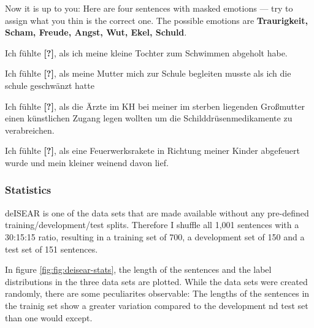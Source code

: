 Now it is up to you: Here are four sentences with masked emotions --- try to assign what you thin is the correct one.
The possible emotions are \textbf{Traurigkeit, Scham, Freude, Angst, Wut, Ekel, Schuld}.


\begin{examples}
  \item \label{itm:deisear1} Ich fühlte \textbf{[?]}, als ich meine kleine Tochter zum Schwimmen abgeholt habe.
  \item \label{itm:deisear2} Ich fühlte \textbf{[?]}, als meine Mutter mich zur Schule begleiten musste als ich die schule geschwänzt hatte
  \item \label{itm:deisear3} Ich fühlte \textbf{[?]}, als die Ärzte im KH bei meiner im sterben liegenden Großmutter einen künstlichen Zugang legen wollten um die Schilddrüsenmedikamente zu verabreichen.
  \item \label{itm:deisear4} Ich fühlte \textbf{[?]}, als eine Feuerwerksrakete in Richtung meiner Kinder abgefeuert wurde und mein kleiner weinend davon lief.
\end{examples}



\subsubsection{Statistics}

deISEAR is one of the data sets that are made available without any pre-defined training/development/test splits.
Therefore I shuffle all 1,001 sentences with a 30:15:15 ratio, resulting in a training set of 700, a development set
of 150 and a test set of 151 sentences.

In figure \ref{fig:fig:deisear-stats}, the length of the sentences and the label distributions in the three data sets are
plotted. While the data sets were created randomly, there are some peculiarites observable: The lengths of the sentences
in the trainig set show a greater variation compared to the development nd test set than one would except.

